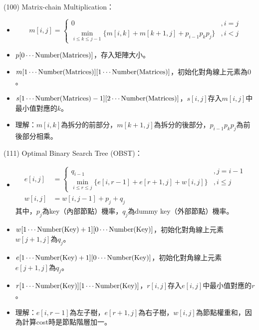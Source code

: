\item \begin{theorem}{(100)} Matrix-chain Multiplication：\begin{itemize}
        \item \begin{equation}
            m[i, j] = \begin{cases}
                0 &, i = j \\
                \min_{i \le k \le j - 1}\{m[i, k] + m[k + 1, j] + p_{i - 1}p_kp_j\} &, i < j
            \end{cases}
        \end{equation} 
        \item $p[0 \cdots \operatorname{Number}(\text{Matrices})]$，存入矩陣大小。
        \item $m[1 \cdots \operatorname{Number}(\text{Matrices})][1 \cdots \operatorname{Number}(\text{Matrices})]$，初始化對角線上元素為$0$。
        \item $s[1 \cdots \operatorname{Number}(\text{Matrices}) - 1][2 \cdots \operatorname{Number}(\text{Matrices})]$，$s[i, j]$存入$m[i, j]$中最小值對應的$k$。
        \item 理解：$m[i, k]$為拆分的前部分，$m[k + 1, j]$為拆分的後部分，$p_{i - 1}p_kp_j$為前後部分相乘。
    \end{itemize}
\end{theorem}

\item \begin{theorem}{(111)} Optimal Binary Search Tree (OBST)：\begin{itemize}
        \item \begin{equation}
            \begin{aligned}
                e[i, j] & = \begin{cases}
                    q_{i - 1} &, j = i - 1 \\
                    \min_{i \le r \le j}\{e[i, r - 1] + e[r + 1, j] + w[i, j]\} &, i \le j
                \end{cases} \\
                w[i, j] & = w[i, j - 1] + p_j + q_j
            \end{aligned}
        \end{equation} 其中，$p_j$為key（內部節點）機率，$q_j$為dummy key（外部節點）機率。
        \item $w[1 \cdots \operatorname{Number}(\text{Key}) + 1][0 \cdots \operatorname{Number}(\text{Key})]$，初始化對角線上元素$w[j + 1, j]$為$q_j$。
        \item $e[1 \cdots \operatorname{Number}(\text{Key}) + 1][0 \cdots \operatorname{Number}(\text{Key})]$，初始化對角線上元素$e[j + 1, j]$為$q_j$。
        \item $r[1 \cdots \operatorname{Number}(\text{Key})][1 \cdots \operatorname{Number}(\text{Key})]$，$r[i, j]$存入$e[i, j]$中最小值對應的$r$。
        \item 理解：$e[i, r - 1]$為左子樹，$e[r + 1, j]$為右子樹，$w[i, j]$為節點權重和，因為計算cost時是節點階層加一。
    \end{itemize}
\end{theorem}
